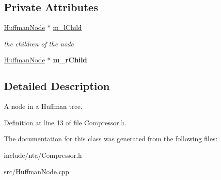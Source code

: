 \subsection*{Private Attributes}
\begin{DoxyCompactItemize}
\item 
\mbox{\label{classnta_1_1HuffmanNode_ae8cdbf035355dfbe64bdba9b2b29a589}} 
\hyperlink{classnta_1_1HuffmanNode}{Huffman\+Node} $\ast$ \hyperlink{classnta_1_1HuffmanNode_ae8cdbf035355dfbe64bdba9b2b29a589}{m\+\_\+l\+Child}
\begin{DoxyCompactList}\small\item\em the children of the node \end{DoxyCompactList}\item 
\mbox{\label{classnta_1_1HuffmanNode_adfc2e8ad6db0b3a46d7187a7c839d350}} 
\hyperlink{classnta_1_1HuffmanNode}{Huffman\+Node} $\ast$ {\bfseries m\+\_\+r\+Child}
\end{DoxyCompactItemize}


\subsection{Detailed Description}
A node in a Huffman tree. 

Definition at line 13 of file Compressor.\+h.



The documentation for this class was generated from the following files\+:\begin{DoxyCompactItemize}
\item 
include/nta/Compressor.\+h\item 
src/Huffman\+Node.\+cpp\end{DoxyCompactItemize}
